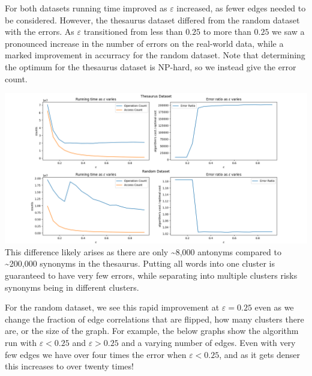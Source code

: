 \documentclass[
]{article}
\begin{document}
For both datasets running time improved as {\(\varepsilon\)} increased,
as fewer edges needed to be considered. However, the thesaurus dataset
differed from the random dataset with the errors. As {\(\varepsilon\)}
transitioned from less than {\(0.25\)} to more than {\(0.25\)} we saw a
pronounced increase in the number of errors on the real-world data,
while a marked improvement in accurracy for the random dataset. Note
that determining the optimum for the thesaurus dataset is NP-hard, so we
instead give the error count.

\includegraphics{images/opposite_trends.png}\\
This difference likely arises as there are only \textasciitilde8,000
antonyms compared to \textasciitilde200,000 synonyms in the thesaurus.
Putting all words into one cluster is guaranteed to have very few
errors, while separating into multiple clusters risks synonyms being in
different clusters.

For the random dataset, we see this rapid improvement at
{\(\varepsilon = 0.25\)} even as we change the fraction of edge
correlations that are flipped, how many clusters there are, or the size
of the graph. For example, the below graphs show the algorithm run with
{\(\varepsilon < 0.25\)} and {\(\varepsilon > 0.25\)} and a varying
number of edges. Even with very few edges we have over four times the
error when {\(\varepsilon < 0.25\)}, and as it gets denser this
increases to over twenty times!
\end{document}
